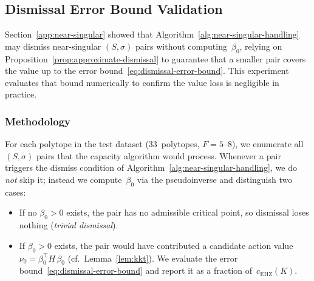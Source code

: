 %
%
%
%

\subsection{Dismissal Error Bound Validation}
\label{sec:dismissal-error}

Section~\ref{app:near-singular} showed that
Algorithm~\ref{alg:near-singular-handling} may dismiss near-singular
$(S, \sigma)$ pairs without computing~$\beta_0$, relying on
Proposition~\ref{prop:approximate-dismissal} to guarantee that a
smaller pair covers the value up to the error
bound~\eqref{eq:dismissal-error-bound}.
This experiment evaluates that bound numerically to confirm the
value loss is negligible in practice.

\subsubsection*{Methodology}
For each polytope in the test dataset (33~polytopes, $F = 5$--$8$),
we enumerate all $(S, \sigma)$ pairs that the capacity algorithm
would process.
Whenever a pair triggers the dismiss condition of
Algorithm~\ref{alg:near-singular-handling}, we do \emph{not} skip
it; instead we compute~$\beta_0$ via the pseudoinverse and
distinguish two cases:
\begin{itemize}
\item If no $\beta_0 > 0$ exists, the pair has no admissible
  critical point, so dismissal loses nothing
  (\emph{trivial dismissal}).
\item If $\beta_0 > 0$ exists, the pair would have contributed a
  candidate action value~$\nu_0 = \beta_0^\top H\,\beta_0$
  (cf.\ Lemma~\ref{lem:kkt}).
  We evaluate the error bound~\eqref{eq:dismissal-error-bound}
  and report it as a fraction of~$c_{\mathrm{EHZ}}(K)$.
\end{itemize}

